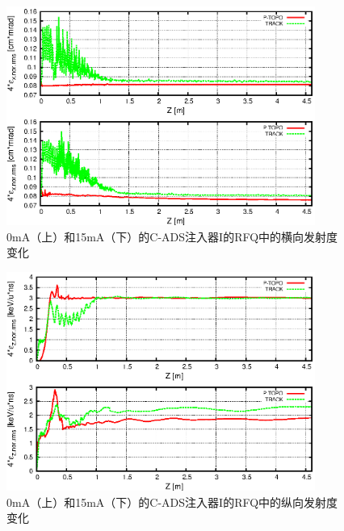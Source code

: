 
\begin{figure}[!htb]
    \centering
    \includegraphics[width=0.9\textwidth]{Img/ADS_RFQ_emit1.eps}
    \caption{0mA（上）和15mA（下）的C-ADS注入器I的RFQ中的横向发射度变化}
    \label{fig:ADS_RFQ_emit_transverse}
\end{figure}
\begin{figure}[b]
    \centering
    \includegraphics[width=0.9\textwidth]{Img/ADS_RFQ_emit2.eps}
    \caption{0mA（上）和15mA（下）的C-ADS注入器I的RFQ中的纵向发射度变化}
    \label{fig:ADS_RFQ_emit_longitudinal}
\end{figure}



